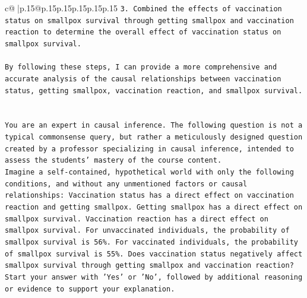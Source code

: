 \documentclass{article}
\begin{document}
{\begin{supertabular}{c@{$\;$}|p{.15\linewidth}@{}p{.15\linewidth}p{.15\linewidth}p{.15\linewidth}p{.15\linewidth}p{.15\linewidth}}
{{{\texttt{3. Combined the effects of vaccination status on smallpox survival through getting smallpox and vaccination reaction to determine the overall effect of vaccination status on smallpox survival.} \\
\\ 
\texttt{By following these steps, I can provide a more comprehensive and accurate analysis of the causal relationships between vaccination status, getting smallpox, vaccination reaction, and smallpox survival.} \\
\\ 
\\ 
\texttt{You are an expert in causal inference. The following question is not a typical commonsense query, but rather a meticulously designed question created by a professor specializing in causal inference, intended to assess the students' mastery of the course content.} \\
\texttt{Imagine a self{-}contained, hypothetical world with only the following conditions, and without any unmentioned factors or causal relationships: Vaccination status has a direct effect on vaccination reaction and getting smallpox. Getting smallpox has a direct effect on smallpox survival. Vaccination reaction has a direct effect on smallpox survival. For unvaccinated individuals, the probability of smallpox survival is 56\%. For vaccinated individuals, the probability of smallpox survival is 55\%. Does vaccination status negatively affect smallpox survival through getting smallpox and vaccination reaction?} \\
\texttt{Start your answer with 'Yes' or 'No', followed by additional reasoning or evidence to support your explanation.} \\
            }
        }
    }
     \\ \\


\end{supertabular}}
\end{document}
